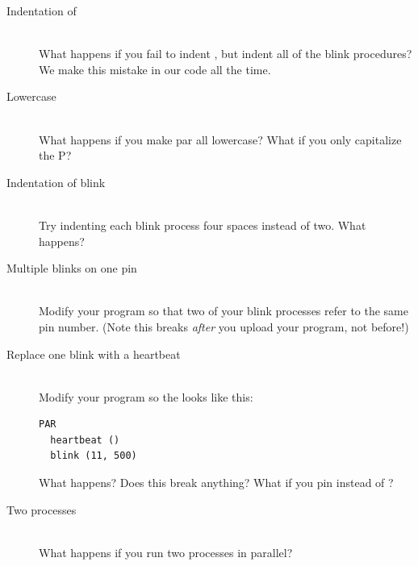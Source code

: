 \begin{description}
		\item[Indentation of \PAR]\ \\
	What happens if you fail to indent \PAR, but indent all of the {\procname blink} procedures? We make this mistake in our code all the time.
		\item[Lowercase \PAR]\ \\
	What happens if you make {\strong par} all lowercase? What if you only capitalize the {\strong P}? 
	\item[Indentation of {\procname blink}]\ \\
	Try indenting each {\procname blink} process four spaces instead of two. What happens?
	\item[Multiple {\procname blink}s on one pin]\ \\
	Modify your program so that two of your {\procname blink} processes refer to the same pin number. (Note this breaks {\em after} you upload your program, not before!)
	\item[Replace one {\procname blink} with a {\procname heartbeat}]\ \\
	Modify your program so the \PAR looks like this:
	\begin{lstlisting}[firstnumber=2]
PAR
  heartbeat ()
  blink (11, 500)
	\end{lstlisting}
	What happens? Does this break anything? What if you \blink pin \pinthirteen instead of \pineleven?
	\item[Two \heartbeat processes]\ \\
	What happens if you run two \heartbeat processes in parallel?
\end{description}
	
